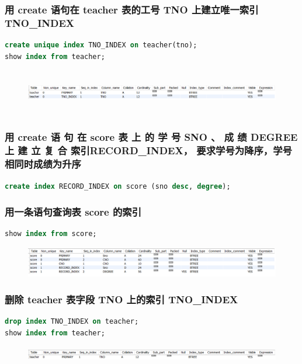 \documentclass{ctexart}
\begin{document}
\subsubsection{用 create 语句在 teacher 表的工号 TNO 上建立唯一索引 TNO\_INDEX}
\begin{lstlisting}[language=sql]
create unique index TNO_INDEX on teacher(tno);
show index from teacher;
\end{lstlisting}
\begin{figure}[H]
	\centering 
	\includegraphics[height=2cm,width=16cm]{19.png}
	\end{figure}
\subsubsection{用 create 语 句 在 score 表 上 的 学 号 SNO 、 成 绩 DEGREE 上 建 立 复 合 索引RECORD\_INDEX， 要求学号为降序，学号相同时成绩为升序}
\begin{lstlisting}[language=sql]
	create index RECORD_INDEX on score (sno desc, degree);
\end{lstlisting}

\subsubsection{用一条语句查询表 score 的索引}
\begin{lstlisting}[language=sql]
	show index from score;
\end{lstlisting}
\begin{figure}[H]
	\centering 
	\includegraphics[height=1.3cm,width=16cm]{20.png}
	\end{figure}
\subsubsection{删除 teacher 表字段 TNO 上的索引 TNO\_INDEX}
\begin{lstlisting}[language=sql]
drop index TNO_INDEX on teacher;
show index from teacher;
\end{lstlisting}
\begin{figure}[H]
	\centering 
	\includegraphics[height=0.7cm,width=16cm]{22.png}
	\end{figure}
\end{document}
